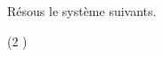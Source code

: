 %
%
    Résous le système suivants.
    \begin{tasks}(2 )
        \task {}
        \task {}
    \end{tasks}
